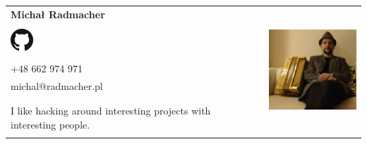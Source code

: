 \documentclass[a4paper]{article}
\begin{document}
\begin{tabular}{p{7cm}r}
\textbf{Michał Radmacher}&\multirow{10}{*}{\includegraphics[width=40mm]{mr.jpg}}\\
&\\
\href{https://github.com/mradmacher/}{\includegraphics{github.png}}\\
&\\
+48 662 974 971&\\
michal@radmacher.pl&\\
&\\
&\\
I like hacking around interesting projects with interesting people.
&\\
&
\end{tabular}

\subsection*{}
\end{document}
